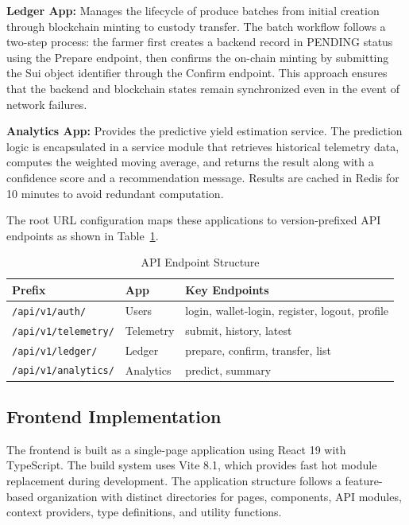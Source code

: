 \textbf{Ledger App:} Manages the lifecycle of produce batches from initial creation through blockchain minting to custody transfer. The batch workflow follows a two-step process: the farmer first creates a backend record in PENDING status using the Prepare endpoint, then confirms the on-chain minting by submitting the Sui object identifier through the Confirm endpoint. This approach ensures that the backend and blockchain states remain synchronized even in the event of network failures.

\textbf{Analytics App:} Provides the predictive yield estimation service. The prediction logic is encapsulated in a service module that retrieves historical telemetry data, computes the weighted moving average, and returns the result along with a confidence score and a recommendation message. Results are cached in Redis for 10 minutes to avoid redundant computation.

The root URL configuration maps these applications to version-prefixed API endpoints as shown in Table~\ref{tab:api_endpoints}.

\begin{table}[H]
\centering
\caption{API Endpoint Structure}
\label{tab:api_endpoints}
\begin{tabularx}{\textwidth}{|l|l|X|}
\hline
\textbf{Prefix} & \textbf{App} & \textbf{Key Endpoints} \\
\hline
\texttt{/api/v1/auth/} & Users & login, wallet-login, register, logout, profile \\
\hline
\texttt{/api/v1/telemetry/} & Telemetry & submit, history, latest \\
\hline
\texttt{/api/v1/ledger/} & Ledger & prepare, confirm, transfer, list \\
\hline
\texttt{/api/v1/analytics/} & Analytics & predict, summary \\
\hline
\end{tabularx}
\end{table}

\subsection{Frontend Implementation}

The frontend is built as a single-page application using React 19 with TypeScript. The build system uses Vite 8.1, which provides fast hot module replacement during development. The application structure follows a feature-based organization with distinct directories for pages, components, API modules, context providers, type definitions, and utility functions.

